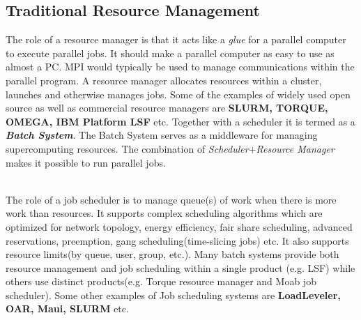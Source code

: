 \documentclass[a4paper, 12pt]{article}
\begin{document}
\subsection{Traditional Resource Management}
The role of a resource manager is that it acts like a \textit{glue} for a parallel computer to execute parallel jobs. It should make a parallel computer as easy to use as almost a PC. MPI would typically be used to manage communications within the parallel program. A resource manager allocates resources within a cluster, launches and otherwise manages jobs. Some of the examples of widely used open source as well as commercial resource managers are \textbf{SLURM, TORQUE, OMEGA, IBM Platform LSF} etc. Together with a scheduler it is termed as a \textbf{\textit{Batch System}}. The Batch System serves as a middleware for managing supercomputing resources. The combination of \textit{Scheduler}$+$\textit{Resource Manager} makes it possible to run parallel jobs.\par
\noindent
\\
The role of a job scheduler is to manage queue(s) of work when there is more work than resources. It supports complex scheduling algorithms which are optimized for network topology, energy efficiency, fair share scheduling, advanced reservations, preemption, gang scheduling(time-slicing jobs) etc. It also supports resource limits(by queue, user, group, etc.). Many batch systems provide both resource management and job scheduling within a single product (e.g. LSF) while others use distinct products(e.g. Torque resource manager and Moab job scheduler). Some other examples of Job scheduling systems are \textbf{LoadLeveler, OAR, Maui, SLURM} etc.
\end{document}
